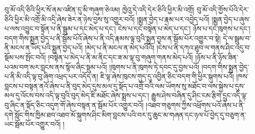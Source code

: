 བུ་མོ་འདི་ཅིའི་ཕྱིར་སོ་ནམ་འཛིན་དུ་མི་གཞུག་ཅེའམ། ཁྱེའུ་དེ་འདི་དེར་ཅིའི་ཕྱིར་མི་འགྲོ། བུ་མོ་འདི་གྱོས་པོའི་དེར་ཅིའི་ཕྱིར་མི་འགྲོ་མི་འདྲི་ཞེས་ཟེར་ན་ཉེས་བྱས་སུ་འགྱུར་བའོ། །སྨྱན་བྱེད་པ་རྣམ་པར་འབྱེད་པའོ། །སྨྱན་བྱེད་པ་ཞུས་པ་ལས་འབྱུང་བ་སྟོན་པ་ནི་སྦྲུམ་པ་དང་མེད་པ་དང་། ངེས་པ་དང་བསྟེན་པ་མེད་པ་དང་། ཉོས་པ་དང་ཁུགས་པ་དང་། བདག་གིས་སྨྱན་བྱེད་པ་ནི་སྦོམ་པོའོ་ཞེས་པ་ནི་འདི་རྣམས་ལྟ་བུའི་སྨྱན་བྱས་ན་སྦོམ་པོར་འགྱུར་བ་སྟེ། དེ་ལ་སྦྲུམ་བ་ནི་མངལ་ན་ཡོད་པའི་སྨྱན་བྱེད་པའོ། །མེད་པ་ནི་མངལ་ན་མེད་པའིའོ། །ངེས་པ་ནི་དཀའ་ཐུབ་ལ་གནས་ཤིང་འདུ་བ་སྡོམ་པས་སྤོང་བའོ། །བསྟེན་པ་མེད་པ་ནི་མ་ནིང་དང་ཟ་མ་ལྟ་བུ་གཞུག་གནས་མེད་པའོ། །ཉོས་པ་ནི་ཉོས་ཟིན་པའམ་བག་མར་བླངས་ནས་སྙོལ་ཞིང་སྡུམ་པའོ། །ཁུགས་པ་ནི་ཁུགས་ཏེ་དབང་དུ་བྱས་པའོ། །བདག་གིས་སྨྱན་བྱེད་པ་ནི་མི་འདི་ལྟ་བུ་ཞིག་འཕྲད་པར་འདོད་ན། ཇི་ལྟ་ཞེས་ཁུངས་གུད་དུ་འབྱིན་ཅིང་བདག་གི་ཕྱིར་སྐུགས་པའོ། །ཁས་བླངས་པ་བསྟན་ནའོ་ཞེས་པ་ནི་བུད་མེད་དུས་མལ་དུ་སྡོད་པ་འགྲོ་བའི་ལམ་ཡོགས་སུ་མཐོང་བ་ལས་སྐྱེས་པ་དུས་མལ་དུ་འོངས་བས་འདི་ལྟ་བུའི་བུད་མེད་ཇི་མཐོང་ཞེས་སྨྲས་པ་དང་། རྒྱུས་ཤེས་བཞིན་དུ་ཤིང་ངམ་རྩིག་དྲུང་འདི་ལྟ་བུ་ཞིང་ན་སྡོད་ཅིང་འདུག་གོ་ཞེས་བསྟན་ན་སྦོམ་པོར་འགྱུར་བའོ། །འཐབ་གཅུགས་ཀྱིས་འཕྲོགས་པའོ་ཞེས་པ་ནི་དགེ་སློང་གིས་ཁྱིམ་ཐབ་འཐབ་མོ་སྐུགས་ཤིང་མིག་བླངས་པའི་བར་དུ་ཆུང་མ་གཞན་དང་ཉལ་པོ་བྱེད་དུ་བཅུག་ན་ཡང་སྦོམ་པོར་འགྱུར་བའོ། །
